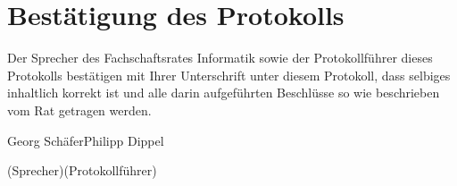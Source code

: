 \documentclass[a4paper, 11pt]{article} %
\newcommand{\protokoller}{Philipp Dippel}
\newcommand{\fsiPresident}{Georg Schäfer}
\begin{document}
\section{Bestätigung des Protokolls}
Der Sprecher des Fachschaftsrates Informatik sowie der Protokollführer dieses Protokolls bestätigen mit Ihrer Unterschrift unter diesem Protokoll, dass selbiges inhaltlich korrekt ist und alle darin aufgeführten Beschlüsse so wie beschrieben vom Rat getragen werden.
\\

\vspace{3.5cm}
\hrulefill \hfill \hrulefill

\fsiPresident \hfill \protokoller

{\footnotesize (Sprecher)\hfill (Protokollführer)}
\end{document}
